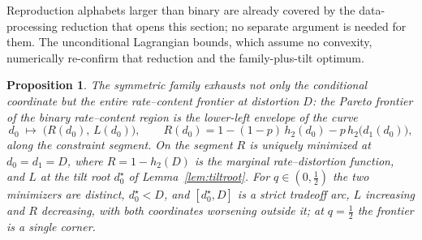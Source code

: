 \documentclass[11pt,onecolumn]{IEEEtran}
\newtheorem{proposition}[theorem]{Proposition}
\begin{document}
Reproduction alphabets larger than binary are already covered by the
data-processing reduction that opens this section; no separate argument
is needed for them. The unconditional Lagrangian bounds, which assume no
convexity, numerically re-confirm that reduction and the
family-plus-tilt optimum.

\begin{proposition}\label{rem:binfrontier}
The symmetric family exhausts not only the conditional coordinate but
the entire rate--content frontier at distortion $D$: the Pareto
frontier of the binary rate--content region is the lower-left envelope
of the curve
\[
d_0\;\longmapsto\;\bigl(R(d_0),\,L(d_0)\bigr),
\qquad
R(d_0)=1-(1-p)\,h_2(d_0)-p\,h_2\bigl(d_1(d_0)\bigr),
\]
along the constraint segment. On the segment $R$ is uniquely minimized
at $d_0=d_1=D$, where $R=1-h_2(D)$ is the marginal rate--distortion
function, and $L$ at the tilt root $d_0^\star$ of
Lemma~\ref{lem:tiltroot}. For $q\in(0,\tfrac12)$ the two minimizers are
distinct, $d_0^\star<D$, and $[d_0^\star,D]$ is a strict tradeoff arc,
$L$ increasing and $R$ decreasing, with both coordinates worsening
outside it; at $q=\tfrac12$ the frontier is a single corner.
\end{proposition}
\end{document}
